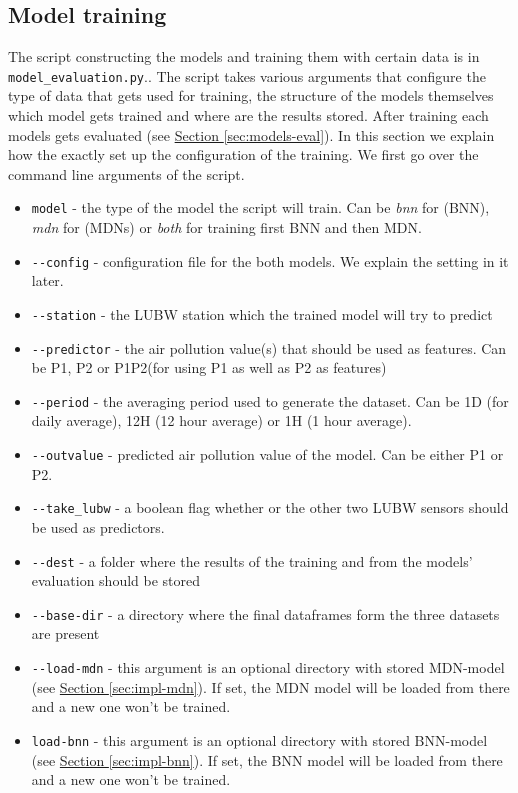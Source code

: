 \documentclass[12pt,a4paper,twoside]{scrartcl}
\numberwithin{equation}{section}
\newcommand{\refsec}[1]{\hyperref[#1]{Section \ref*{#1}}}
\begin{document}
\subsection{Model training}
\label{sec:models-train}
The script constructing the models and training them with certain data is in \texttt{model\_evaluation.py}.. The script takes various arguments that configure the type of data that gets used for training, the structure of the models themselves which model gets trained and where are the results stored. After training each models gets evaluated (see \refsec{sec:models-eval}). In this section we explain how the exactly set up the configuration of the training. We first go over the command line arguments of the script.
\begin{itemize}
\item \texttt{\-\-model} - the type of the model the script will train. Can be \emph{bnn} for (BNN), \emph{mdn} for (MDNs) or \emph{both} for training first BNN and then MDN.
\item \texttt{-{}-config} - configuration file for the both models. We explain the setting in it later.
\item \texttt{-{}-station} - the LUBW station which the trained model will try to predict
\item \texttt{-{}-predictor} - the air pollution value(s) that should be used as features. Can be P1, P2 or P1P2(for using P1 as well as P2 as features)
\item \texttt{-{}-period} - the averaging period used to generate the dataset. Can be 1D (for daily average), 12H (12 hour average) or 1H (1 hour average).
\item \texttt{-{}-outvalue} - predicted air pollution value of the model. Can be either P1 or P2.
\item \texttt{-{}-take\_lubw} - a boolean flag whether or the other two LUBW sensors should be used as predictors.
\item \texttt{-{}-dest} - a folder where the results of the training and from the models' evaluation should be stored
\item \texttt{-{}-base-dir} - a directory where the final dataframes form the three datasets are present
\item \texttt{-{}-load-mdn} - this argument is an optional directory with stored MDN-model (see \refsec{sec:impl-mdn}). If set, the MDN model will be loaded from there and a new one won't be trained.
\item \texttt{\-\-load-bnn} - this argument is an optional directory with stored BNN-model (see \refsec{sec:impl-bnn}). If set, the BNN  model will be loaded from there and a new one won't be trained.
\end{itemize}
\end{document}

